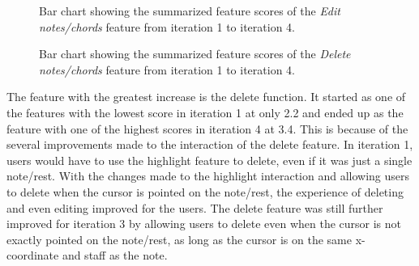 			\begin{figure}[H]
				\centering
			    \caption{Bar chart showing the summarized feature scores of the \textit{Edit notes/chords} feature from iteration 1 to iteration 4.}
			    \label{fig:edit-bar}
			\end{figure} 


			\begin{figure}[H]
				\centering
			    \caption{Bar chart showing the summarized feature scores of the \textit{Delete notes/chords} feature from iteration 1 to iteration 4.}
			    \label{fig:delete-bar}
			\end{figure} 

			The feature with the greatest increase is the delete function. It started as one of the features with the lowest score in iteration 1 at only 2.2 and ended up as the feature with one of the highest scores in iteration 4 at 3.4. This is because of the several improvements made to the interaction of the delete feature. In iteration 1, users would have to use the highlight feature to delete, even if it was just a single note/rest. With the changes made to the highlight interaction and allowing users to delete when the cursor is pointed on the note/rest, the experience of deleting and even editing improved for the users. The delete feature was still further improved for iteration 3 by allowing users to delete even when the cursor is not exactly pointed on the note/rest, as long as the cursor is on the same x-coordinate and staff as the note. 


